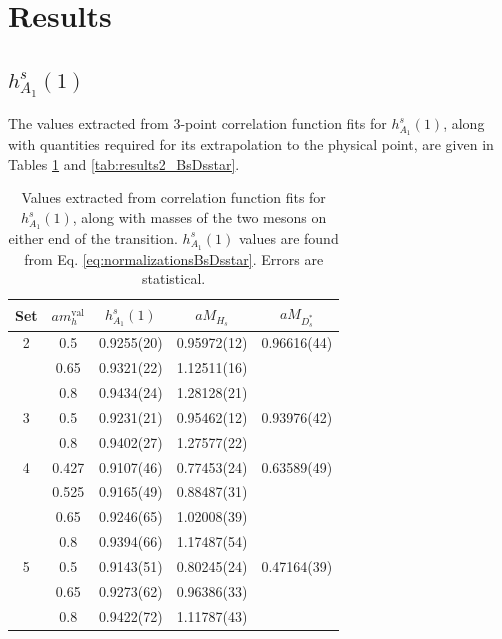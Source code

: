 \section{Results}
\label{sec:results_BsDsstar}

\subsection{$h^s_{A_1}(1)$}

The values extracted from 3-point correlation function fits for $h^s_{A_1}(1)$, along with quantities required for its extrapolation to the physical point, are given in Tables \ref{tab:results_BsDsstar} and \ref{tab:results2_BsDsstar}.

\begin{table}
\begin{center}
\begin{tabular}{ c c c c c }
\hline
Set & $am_h^{\text{val}}$ & $h^s_{A_1}(1)$& $aM_{H_s}$& $aM_{D^*_s}$\\ [0.5ex]
\hline
2 & 0.5 & 0.9255(20) & 0.95972(12) & 0.96616(44)\\ [0.5ex] 
 & 0.65 & 0.9321(22) & 1.12511(16) & \\ [0.5ex] 
 & 0.8 & 0.9434(24) & 1.28128(21) & \\ [0.5ex] 
\hline
3 & 0.5 & 0.9231(21) & 0.95462(12) & 0.93976(42)\\ [0.5ex] 
 & 0.8 & 0.9402(27) & 1.27577(22) & \\ [0.5ex] 
\hline
4 & 0.427 & 0.9107(46) & 0.77453(24) & 0.63589(49)\\ [0.5ex] 
 & 0.525 & 0.9165(49) & 0.88487(31) & \\ [0.5ex] 
 & 0.65 & 0.9246(65) & 1.02008(39) & \\ [0.5ex] 
 & 0.8 & 0.9394(66) & 1.17487(54) & \\ [0.5ex] 
\hline
5 & 0.5 & 0.9143(51) & 0.80245(24) & 0.47164(39)\\ [0.5ex] 
 & 0.65 & 0.9273(62) & 0.96386(33) & \\ [0.5ex] 
 & 0.8 & 0.9422(72) & 1.11787(43) & \\ [0.5ex] 
\hline
\end{tabular}
\caption{Values extracted from correlation function fits for $h^s_{A_1}(1)$, along with masses of the two mesons on either end of the transition. $h^s_{A_1}(1)$ values are found from Eq. \eqref{eq:normalizationsBsDsstar}. Errors are statistical. \label{tab:results_BsDsstar}}
\end{center}
\end{table}

